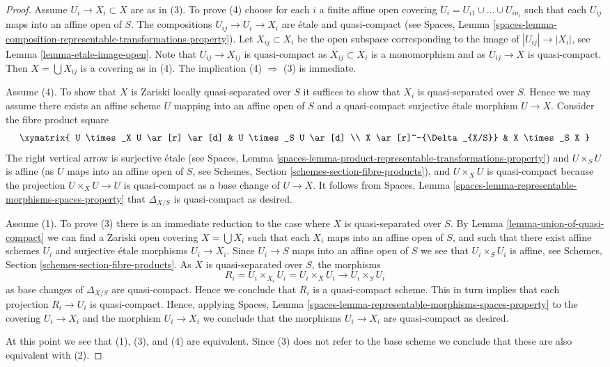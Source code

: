 \begin{proof}
Assume  $U_i \to X_i \subset X$ are as in (3). To prove (4)
choose for each $i$ a finite affine open covering $U_i =
U_{i1} \cup \ldots \cup U_{in_i}$ such that each $U_{ij}$ maps
into an affine open of $S$. The compositions
$U_{ij} \to U_i \to X_i$ are \'etale and quasi-compact (see
Spaces, Lemma
\ref{spaces-lemma-composition-representable-transformations-property}).
Let $X_{ij} \subset X_i$ be the open subspace corresponding to
the image of $|U_{ij}| \to |X_i|$, see
Lemma \ref{lemma-etale-image-open}.
Note that $U_{ij} \to X_{ij}$ is quasi-compact as $X_{ij} \subset X_i$
is a monomorphism and as $U_{ij} \to X$ is quasi-compact.
Then $X = \bigcup X_{ij}$ is a covering as in (4).
The implication (4) $\Rightarrow$ (3) is immediate.

\medskip\noindent
Assume (4). To show that $X$ is Zariski locally quasi-separated over $S$
it suffices to show that $X_i$ is quasi-separated over $S$.
Hence we may assume there exists an affine scheme $U$ mapping into
an affine open of $S$ and a quasi-compact surjective \'etale
morphism $U \to X$. Consider the fibre product square
$$
\xymatrix{
U \times_X U \ar[r] \ar[d] & U \times_S U \ar[d] \\
X \ar[r]^-{\Delta_{X/S}} & X \times_S X
}
$$
The right vertical arrow is surjective \'etale (see
Spaces, Lemma
\ref{spaces-lemma-product-representable-transformations-property})
and $U \times_S U$ is affine (as $U$ maps into an affine open of $S$, see
Schemes, Section \ref{schemes-section-fibre-products}),
and $U \times_X U$ is quasi-compact
because the projection $U \times_X U \to U$ is quasi-compact as a
base change of $U \to X$. It follows from
Spaces, Lemma \ref{spaces-lemma-representable-morphisms-spaces-property}
that $\Delta_{X/S}$ is quasi-compact as desired.

\medskip\noindent
Assume (1). To prove (3) there is an immediate reduction to the case
where $X$ is quasi-separated over $S$. By
Lemma \ref{lemma-union-of-quasi-compact}
we can find a Zariski open covering $X = \bigcup X_i$ such that each
$X_i$ maps into an affine open of $S$, and such that there exist affine
schemes $U_i$ and surjective \'etale morphisms $U_i \to X_i$.
Since $U_i \to S$ maps into an affine open of $S$ we see that
$U_i \times_S U_i$ is affine, see
Schemes, Section \ref{schemes-section-fibre-products}.
As $X$ is quasi-separated over $S$, the morphisms
$$
R_i = U_i \times_{X_i} U_i = U_i \times_X U_i
\longrightarrow
U_i \times_S U_i
$$
as base changes of $\Delta_{X/S}$ are quasi-compact. Hence we conclude
that $R_i$ is a quasi-compact scheme. This in turn implies that each
projection $R_i \to U_i$ is quasi-compact. Hence, applying
Spaces, Lemma \ref{spaces-lemma-representable-morphisms-spaces-property}
to the covering $U_i \to X_i$ and the morphism $U_i \to X_i$
we conclude that the morphisms $U_i \to X_i$ are quasi-compact as desired.

\medskip\noindent
At this point we see that (1), (3), and (4) are equivalent. Since (3) does
not refer to the base scheme we conclude that these are also equivalent
with (2).
\end{proof}

